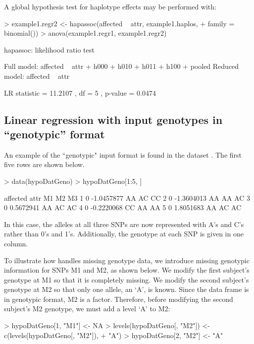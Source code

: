 \documentclass[article, shortnames]{jss}
\begin{document}
A global hypothesis test for haplotype effects may be performed with:
\begin{Schunk}
\begin{Sinput}
> example1.regr2 <- hapassoc(affected ~ attr, example1.haplos, 
+     family = binomial())
> anova(example1.regr1, example1.regr2)
\end{Sinput}
\begin{Soutput}
	hapassoc: likelihood ratio test

Full model: affected ~ attr + h000 + h010 + h011 + h100 + pooled 
Reduced model: affected ~ attr 

LR statistic = 11.2107 , df = 5 , p-value =  0.0474 
\end{Soutput}
\end{Schunk}

\subsection{Linear regression with input genotypes in ``genotypic'' format}

An example of the ``genotypic" input format is found in the dataset 
. The first five rows are shown below.

\begin{Schunk}
\begin{Sinput}
> data(hypoDatGeno)
> hypoDatGeno[1:5, ]
\end{Sinput}
\begin{Soutput}
  affected       attr M1 M2 M3
1        0 -1.0457877 AA AC CC
2        0 -1.3604013 AA AA AC
3        0  0.5672941 AA AC AC
4        0 -0.2220068 CC AA AA
5        0  1.8051683 AA AC AC
\end{Soutput}
\end{Schunk}
In this case, the alleles at all three SNPs are now represented with A's
and C's rather than 0's and 1's. Additionally, the genotype at each 
SNP is given in one column.

To illustrate how  handles missing genotype data,
we introduce missing genotypic information for SNPs M1 and M2,
as shown below. We modify the first subject's genotype at M1
so that it is completely missing. We modify the second subject's
genotype at M2 so that only one allele, an `A', is known.
Since the data frame  is in genotypic format,
M2 is a factor.  Therefore, before modifying the second subject's M2
genotype, we must add a level `A' to M2:
\begin{Schunk}
\begin{Sinput}
> hypoDatGeno[1, "M1"] <- NA
> levels(hypoDatGeno[, "M2"]) <- c(levels(hypoDatGeno[, "M2"]), 
+     "A")
> hypoDatGeno[2, "M2"] <- "A"
\end{Sinput}
\end{Schunk}
\end{document}
